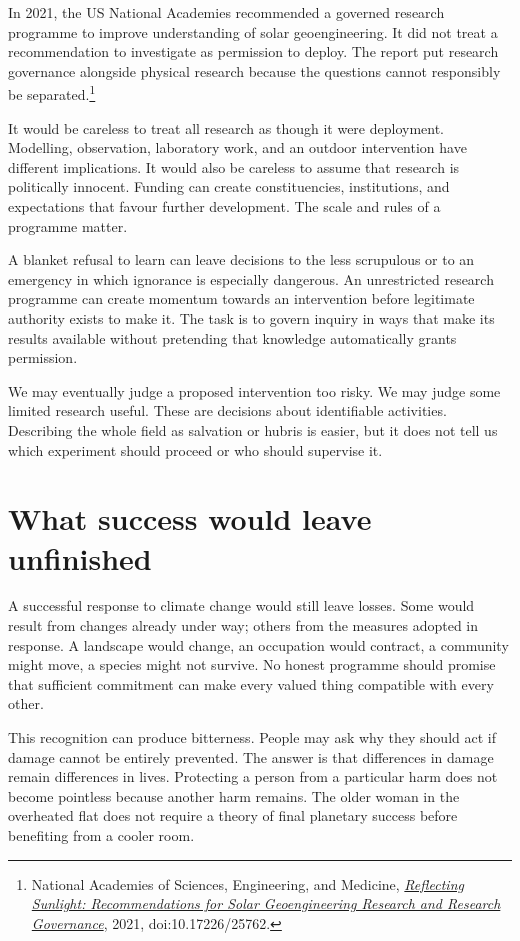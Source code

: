 \documentclass[12pt,a4paper]{book}
\begin{document}
In 2021, the US National Academies recommended a governed research programme to improve understanding of solar geoengineering. It did not treat a recommendation to investigate as permission to deploy. The report put research governance alongside physical research because the questions cannot responsibly be separated.\footnote{National Academies of Sciences, Engineering, and Medicine, \href{https://www.nationalacademies.org/read/25762}{\emph{Reflecting Sunlight: Recommendations for Solar Geoengineering Research and Research Governance}}, 2021, doi:10.17226/25762.}

It would be careless to treat all research as though it were deployment. Modelling, observation, laboratory work, and an outdoor intervention have different implications. It would also be careless to assume that research is politically innocent. Funding can create constituencies, institutions, and expectations that favour further development. The scale and rules of a programme matter.

A blanket refusal to learn can leave decisions to the less scrupulous or to an emergency in which ignorance is especially dangerous. An unrestricted research programme can create momentum towards an intervention before legitimate authority exists to make it. The task is to govern inquiry in ways that make its results available without pretending that knowledge automatically grants permission.

We may eventually judge a proposed intervention too risky. We may judge some limited research useful. These are decisions about identifiable activities. Describing the whole field as salvation or hubris is easier, but it does not tell us which experiment should proceed or who should supervise it.

\section*{What success would leave unfinished}

A successful response to climate change would still leave losses. Some would result from changes already under way; others from the measures adopted in response. A landscape would change, an occupation would contract, a community might move, a species might not survive. No honest programme should promise that sufficient commitment can make every valued thing compatible with every other.

This recognition can produce bitterness. People may ask why they should act if damage cannot be entirely prevented. The answer is that differences in damage remain differences in lives. Protecting a person from a particular harm does not become pointless because another harm remains. The older woman in the overheated flat does not require a theory of final planetary success before benefiting from a cooler room.
\end{document}
